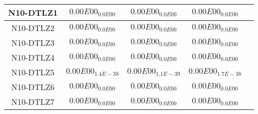 \documentclass{article}
\begin{document}
\begin{table*}[ht!]
\begin{tabular}{|c||c||c||c||c|}
\hline
N10-DTLZ1 &\cellcolor{gray95}$0.00E00_{0.0E00}$ &\cellcolor{gray25}$0.00E00_{0.0E00}$ &$0.00E00_{0.0E00}$\\ 
\hline
N10-DTLZ2 &\cellcolor{gray95}$0.00E00_{0.0E00}$ &\cellcolor{gray25}$0.00E00_{0.0E00}$ &$0.00E00_{0.0E00}$\\ 
\hline
N10-DTLZ3 &\cellcolor{gray95}$0.00E00_{0.0E00}$ &\cellcolor{gray25}$0.00E00_{0.0E00}$ &$0.00E00_{0.0E00}$\\ 
\hline
N10-DTLZ4 &\cellcolor{gray95}$0.00E00_{0.0E00}$ &\cellcolor{gray25}$0.00E00_{0.0E00}$ &$0.00E00_{0.0E00}$\\ 
\hline
N10-DTLZ5 &\cellcolor{gray25}$0.00E00_{1.4E-38}$ &\cellcolor{gray95}$0.00E00_{1.1E-39}$ &$0.00E00_{1.7E-38}$\\ 
\hline
N10-DTLZ6 &\cellcolor{gray95}$0.00E00_{0.0E00}$ &\cellcolor{gray25}$0.00E00_{0.0E00}$ &$0.00E00_{0.0E00}$\\ 
\hline
N10-DTLZ7 &\cellcolor{gray95}$0.00E00_{0.0E00}$ &\cellcolor{gray25}$0.00E00_{0.0E00}$ &$0.00E00_{0.0E00}$\\ 
\hline
\end{tabular}
\end{table*}
\end{document}
